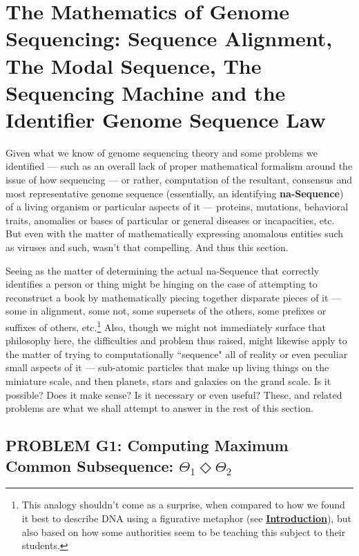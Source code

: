 \documentclass[a4paper, 18pt]{book} %
\begin{document}
\chapter{The Mathematics of Genome Sequencing: Sequence Alignment, The Modal Sequence, The Sequencing Machine and the Identifier Genome Sequence Law}
\label{SECMATHSEQ}

Given what we know of genome sequencing theory and some problems we identified --- such as an overall lack of proper mathematical formalism around the issue of how sequencing --- or rather, computation of the resultant, consensus and most representative genome sequence (essentially, an identifying \textbf{na-Sequence}) of a living organism or particular aspects of it --- proteins, mutations, behavioral traits, anomalies or bases of particular or general diseases or incapacities, etc. But even with the matter of mathematically expressing anomalous entities such as viruses and such, wasn't that compelling. And thus this section.

Seeing as the matter of determining the actual na-Sequence that correctly identifies a person or thing might be hinging on the case of attempting to reconstruct a book by mathematically piecing together disparate pieces of it --- some in alignment, some not, some supersets of the others, some prefixes or suffixes of others, etc.\footnote{This analogy shouldn't come as a surprise, when compared to how we found it best to describe DNA using a figurative metaphor (see \textbf{\hyperref[SEC1]{Introduction}}), but also based on how some authorities seem to be teaching this subject to their students\cite{przytycka_wgs_lecture10}.} Also, though we might not immediately surface that philosophy here, the difficulties and problem thus raised, might likewise apply to the matter of trying to computationally ``sequence" all of reality or even peculiar small aspects of it --- sub-atomic particles that make up living things on the miniature scale, and then planets, stars and galaxies on the grand scale. Is it possible? Does it make sense? Is it necessary or even useful? These, and related problems are what we shall attempt to answer in the rest of this section.

\section{PROBLEM G1: Computing Maximum Common Subsequence: $\Theta_1 \Diamond \Theta_2$}
\label{PROBG1}
\end{document}
